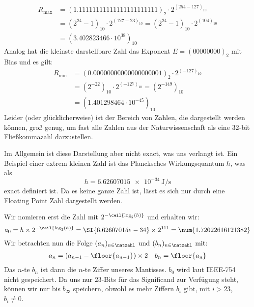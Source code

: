 \begin{enumerate}[label={[OH\arabic*]},start=5]
        \begin{align*}
            R_\text{max} &= (1.11111111111111111111111)_2 \cdot 2^{(254-127)_{10}} \\
            &= (2^{24} - 1)_{10} \cdot 2^{(127-23)_{10}} = (2^{24} - 1)_{10} \cdot 2^{(104)_{10}} \\
            &= (3.402823466 \cdot 10^{38})_{10}
        \end{align*}
        Analog hat die kleinste darstellbare Zahl das Exponent $E = (0000 0000)_2$ mit Bias und es gilt:
        \begin{align*}
            R_\text{min} &= (0.00000000000000000001)_2 \cdot 2^{(-127)_{10}} \\
            &= (2^{-22})_{10} \cdot 2^{(-127)_{10}} = (2^{-149})_{10}\\
            &= (1.401298464 \cdot 10^{-45})_{10}
        \end{align*}
        Leider (oder glücklicherweise) ist der Bereich von Zahlen, die dargestellt werden können, groß genug, um fast alle Zahlen aus der Naturwissenschaft als eine 32-bit Fließkommazahl darzustellen. 

        Im Allgemein ist diese Darstellung aber nicht exact, was uns verlangt ist. Ein Beispiel einer extrem kleinen Zahl ist das Plancksches Wirkungsquantum $h$, was als $$h = \SI{6.62607015e-34}{\joule\per\second}$$ exact definiert ist. Da es keine ganze Zahl ist, lässt es sich nur durch eine Floating Point Zahl dargestellt werden.

        Wir nomieren erst die Zahl mit $2^{-\ceil{\log_2(h)}}$ und erhalten wir:
        \begin{equation*}
            a_0 = h\times2^{-\ceil{\log_2(h)}} = \SI{6.62607015e-34} \times 2^{111} = \num{1.72022616121382}
        \end{equation*}
        Wir betrachten nun die Folge $(a_n)_{n \in \natzahl}$ und $(b_n)_{n \in \natzahl}$ mit:
        \begin{align*}
            a_n = \left(a_{n-1} - \floor{a_{n-1}}\right) \times 2 && b_n = \floor{a_n}
        \end{align*}
        Das $n$-te $b_n$ ist dann die $n$-te Ziffer unseres Mantisses. $b_0$ wird laut IEEE-754 nicht gespeichert. Da uns nur $23$-Bits für das Significand zur Verfügung steht, können wir nur bis $b_{23}$ speichern, obwohl es mehr Ziffern $b_i$ gibt, mit $i > 23$, $b_i \neq 0$.


\end{enumerate}
